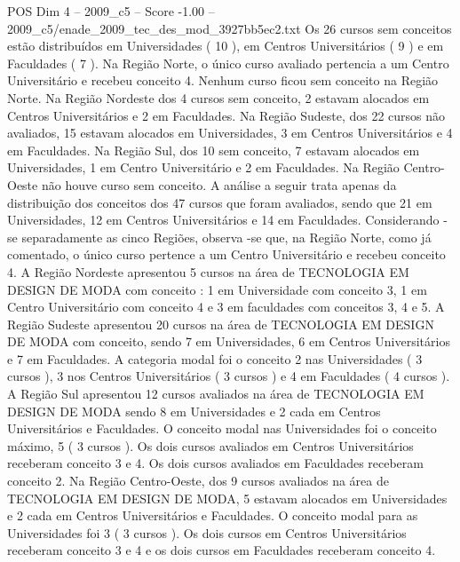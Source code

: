 \begin{textsample}{POS Dim 4 – 2009\_c5 – Score -1.00 – 2009\_c5/enade\_2009\_tec\_des\_mod\_3927bb5ec2.txt}
Os 26 cursos sem conceitos estão distribuídos em Universidades ( 10 ), em Centros Universitários ( 9 ) e em Faculdades ( 7 ).
Na Região Norte, o único curso avaliado pertencia a um Centro Universitário e recebeu conceito 4.
Nenhum curso ficou sem conceito na Região Norte.
Na Região Nordeste dos 4 cursos sem conceito, 2 estavam alocados em Centros Universitários e 2 em Faculdades.
Na Região Sudeste, dos 22 cursos não avaliados, 15 estavam alocados em Universidades, 3 em Centros Universitários e 4 em Faculdades.
Na Região Sul, dos 10 sem conceito, 7 estavam alocados em Universidades, 1 em Centro Universitário e 2 em Faculdades.
Na Região Centro-Oeste não houve curso sem conceito.
A análise a seguir trata apenas da distribuição dos conceitos dos 47 cursos que foram avaliados, sendo que 21 em Universidades, 12 em Centros Universitários e 14 em Faculdades.
Considerando -se separadamente as cinco Regiões, observa -se que, na Região Norte, como já comentado, o único curso pertence a um Centro Universitário e recebeu conceito 4.
A Região Nordeste apresentou 5 cursos na área de TECNOLOGIA EM DESIGN DE MODA com conceito : 1 em Universidade com conceito 3, 1 em Centro Universitário com conceito 4 e 3 em faculdades com conceitos 3, 4 e 5.
A Região Sudeste apresentou 20 cursos na área de TECNOLOGIA EM DESIGN DE MODA com conceito, sendo 7 em Universidades, 6 em Centros Universitários e 7 em Faculdades.
A categoria modal foi o conceito 2 nas Universidades ( 3 cursos ), 3 nos Centros Universitários ( 3 cursos ) e 4 em Faculdades ( 4 cursos ).
A Região Sul apresentou 12 cursos avaliados na área de TECNOLOGIA EM DESIGN DE MODA sendo 8 em Universidades e 2 cada em Centros Universitários e Faculdades.
O conceito modal nas Universidades foi o conceito máximo, 5 ( 3 cursos ).
Os dois cursos avaliados em Centros Universitários receberam conceito 3 e 4.
Os dois cursos avaliados em Faculdades receberam conceito 2.
Na Região Centro-Oeste, dos 9 cursos avaliados na área de TECNOLOGIA EM DESIGN DE MODA, 5 estavam alocados em Universidades e 2 cada em Centros Universitários e Faculdades.
O conceito modal para as Universidades foi 3 ( 3 cursos ).
Os dois cursos em Centros Universitários receberam conceito 3 e 4 e os dois cursos em Faculdades receberam conceito 4.

\end{textsample}
